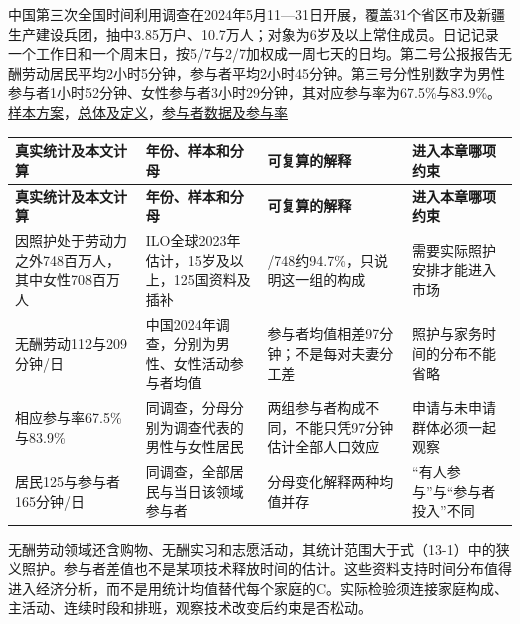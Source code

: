 \documentclass[UTF8,fontset=windows,12pt,a4paper,oneside,openany]{ctexbook}
\begin{document}
中国第三次全国时间利用调查在2024年5月11—31日开展，覆盖31个省区市及新疆生产建设兵团，抽中3.85万户、10.7万人；对象为6岁及以上常住成员。日记记录一个工作日和一个周末日，按5/7与2/7加权成一周七天的日均。第二号公报报告无酬劳动居民平均2小时5分钟，参与者平均2小时45分钟。第三号分性别数字为男性参与者1小时52分钟、女性参与者3小时29分钟，其对应参与率为67.5\%与83.9\%。\href{https://www.stats.gov.cn/xxgk/sjfb/zxfb2020/202410/t20241031_1957217.html}{样本方案}，\href{https://www.stats.gov.cn/xxgk/sjfb/zxfb2020/202410/t20241031_1957216.html}{总体及定义}，\href{https://www.stats.gov.cn/xxgk/sjfb/zxfb2020/202410/t20241031_1957215.html}{参与者数据及参与率}

\begingroup\footnotesize\setlength{\tabcolsep}{4pt}\renewcommand{\arraystretch}{1.25}
\begin{longtable}{>{\raggedright\arraybackslash}p{}>{\raggedright\arraybackslash}p{}>{\raggedright\arraybackslash}p{}>{\raggedright\arraybackslash}p{}}
\toprule
\textbf{真实统计及本文计算} & \textbf{年份、样本和分母} & \textbf{可复算的解释} & \textbf{进入本章哪项约束} \\
\midrule\endfirsthead
\toprule
\textbf{真实统计及本文计算} & \textbf{年份、样本和分母} & \textbf{可复算的解释} & \textbf{进入本章哪项约束} \\
\midrule\endhead
\bottomrule\endfoot
因照护处于劳动力之外748百万人，其中女性708百万人 & ILO全球2023年估计，15岁及以上，125国资料及插补 & 708/748约94.7\%，只说明这一组的构成 & 需要实际照护安排才能进入市场 \\
无酬劳动112与209分钟/日 & 中国2024年调查，分别为男性、女性活动参与者均值 & 参与者均值相差97分钟；不是每对夫妻分工差 & 照护与家务时间的分布不能省略 \\
相应参与率67.5\%与83.9\% & 同调查，分母分别为调查代表的男性与女性居民 & 两组参与者构成不同，不能只凭97分钟估计全部人口效应 & 申请与未申请群体必须一起观察 \\
居民125与参与者165分钟/日 & 同调查，全部居民与当日该领域参与者 & 分母变化解释两种均值并存 & “有人参与”与“参与者投入”不同 \\
\end{longtable}\endgroup


无酬劳动领域还含购物、无酬实习和志愿活动，其统计范围大于式（13-1）中的狭义照护。参与者差值也不是某项技术释放时间的估计。这些资料支持时间分布值得进入经济分析，而不是用统计均值替代每个家庭的C。实际检验须连接家庭构成、主活动、连续时段和排班，观察技术改变后约束是否松动。
\end{document}
